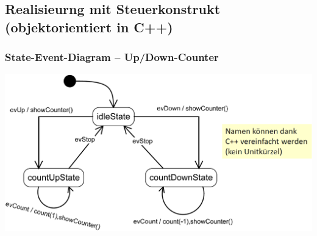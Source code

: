 

\begin{minipage}[t]{0.48\columnwidth}
    
\end{minipage}
\hfill
\begin{minipage}[t]{0.48\columnwidth}
    
\end{minipage}


\columnbreak

 







\subsection{Realisieurng mit Steuerkonstrukt (objektorientiert in C++)}
\label{Realisieurng mit Steuerkonstrukt (objektorientiert in CPP)}

\subsubsection{State-Event-Diagram -- Up/Down-Counter}
\label{State-Event-Diagram -- Up/Down-Counter in CPP}

\begin{center}
    \includegraphics[width=0.7\columnwidth]{images/fsm_up-down-counter_diagramm_CPP.png}
\end{center}


